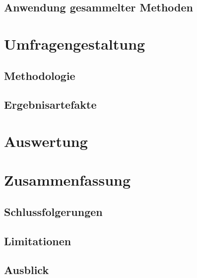 \documentclass[oneside,bibliography=totocnumbered,BCOR=5mm]{scrbook}
\begin{document}
\section{Anwendung gesammelter Methoden}


\chapter{Umfragengestaltung}
\section{Methodologie}
\section{Ergebnisartefakte}

\chapter{Auswertung}

\chapter{Zusammenfassung}
\section{Schlussfolgerungen}
\section{Limitationen}
\section{Ausblick}
\end{document}
